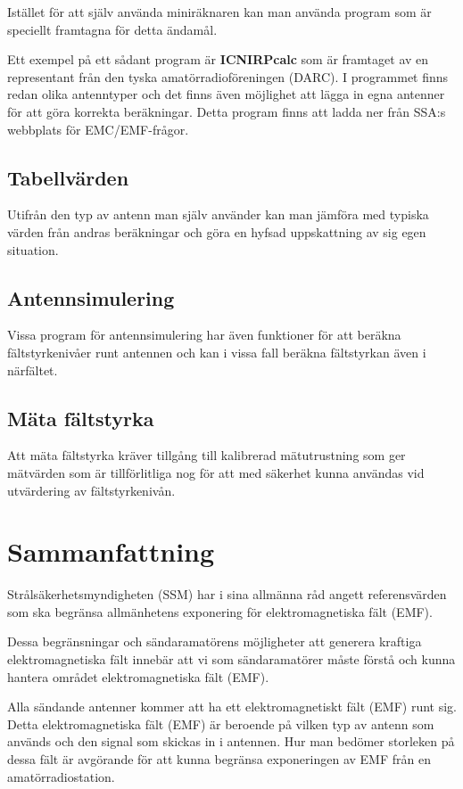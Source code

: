Istället för att själv använda miniräknaren kan man använda program
som är speciellt framtagna för detta ändamål.

Ett exempel på ett sådant program är \textbf{ICNIRPcalc} som är framtaget av en
representant från den tyska amatörradioföreningen (DARC).
I programmet finns redan olika antenntyper och det finns även möjlighet att
lägga in egna antenner för att göra korrekta beräkningar.
Detta program finns att ladda ner från SSA:s webbplats för EMC/EMF-frågor.

\subsection{Tabellvärden}
Utifrån den typ av antenn man själv använder kan man jämföra med
typiska värden från andras beräkningar och göra en hyfsad uppskattning
av sig egen situation.

\subsection{Antennsimulering}
Vissa program för antennsimulering har även funktioner för att beräkna
fältstyrkenivåer runt antennen och kan i vissa fall beräkna fältstyrkan
även i närfältet.

\subsection{Mäta fältstyrka}
Att mäta fältstyrka kräver tillgång till kalibrerad mätutrustning som
ger mätvärden som är tillförlitliga nog för att med säkerhet kunna användas
vid utvärdering av fältstyrkenivån.

\section{Sammanfattning}
Strålsäkerhetsmyndigheten (SSM) har i sina allmänna råd angett referensvärden
som ska begränsa allmänhetens exponering för elektromagnetiska fält (EMF).

Dessa begränsningar och sändaramatörens möjligheter att generera kraftiga
elektromagnetiska fält innebär att vi som sändaramatörer måste förstå
och kunna hantera området elektromagnetiska fält (EMF).

Alla sändande antenner kommer att ha ett elektromagnetiskt fält (EMF)
runt sig.
Detta elektromagnetiska fält (EMF) är beroende på vilken typ av antenn som
används och den signal som skickas in i antennen.
Hur man bedömer storleken på dessa fält är avgörande för att kunna
begränsa exponeringen av EMF från en amatörradiostation.


